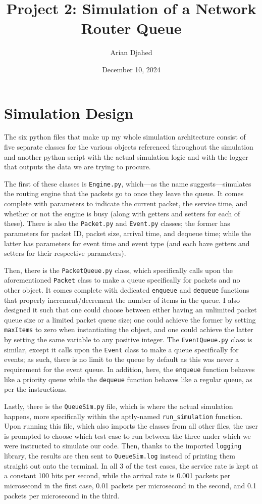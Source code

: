 \documentclass{article}
\title{Project 2: Simulation of a Network Router Queue}
\author{Arian Djahed}
\date{December 10, 2024}
\begin{document}
\maketitle

\section{Simulation Design}

The six python files that make up my whole simulation architecture consist of five separate classes for the various objects referenced throughout the simulation and another python script with the actual simulation logic and with the logger that outputs the data we are trying to procure.

The first of these classes is \verb|Engine.py|, which—as the name suggests—simulates the routing engine that the packets go to once they leave the queue. It comes complete with parameters to indicate the current packet, the service time, and whether or not the engine is busy (along with getters and setters for each of these). There is also the \verb|Packet.py| and \verb|Event.py| classes; the former has parameters for packet ID, packet size, arrival time, and dequeue time; while the latter has parameters for event time and event type (and each have getters and setters for their respective parameters).

Then, there is the \verb|PacketQueue.py| class, which specifically calls upon the aforementioned \verb|Packet| class to make a queue specifically for packets and no other object. It comes complete with dedicated \verb|enqueue| and \verb|dequeue| functions that properly increment/decrement the number of items in the queue. I also designed it such that one could choose between either having an unlimited packet queue size or a limited packet queue size; one could achieve the former by setting \verb|maxItems| to zero when instantiating the object, and one could achieve the latter by setting the same variable to any positive integer. The \verb|EventQueue.py| class is similar, except it calls upon the \verb|Event| class to make a queue specifically for events; as such, there is no limit to the queue by default as this was never a requirement for the event queue. In addition, here, the \verb|enqueue| function behaves like a priority queue while the \verb|dequeue| function behaves like a regular queue, as per the instructions.

Lastly, there is the \verb|QueueSim.py| file, which is where the actual simulation happens, more specifically within the aptly-named \verb|run_simulation| function. Upon running this file, which also imports the classes from all other files, the user is prompted to choose which test case to run between the three under which we were instructed to simulate our code. Then, thanks to the imported \verb|logging| library, the results are then sent to \verb|QueueSim.log| instead of printing them straight out onto the terminal. In all 3 of the test cases, the service rate is kept at a constant 100 bits per second, while the arrival rate is 0.001 packets per microsecond in the first case, 0.01 packets per microsecond in the second, and 0.1 packets per microsecond in the third.
\end{document}
